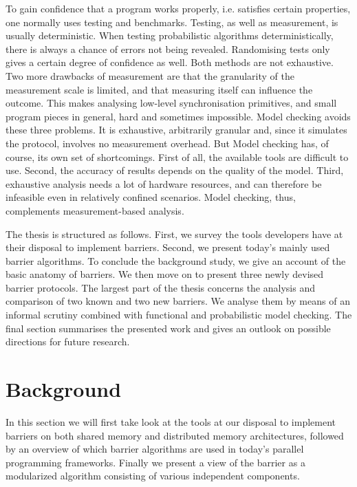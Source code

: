 \documentclass[a4paper, 10pt]{article}
\newcommand*\cleartooddpage{
	\clearpage
	\ifthenelse{\isodd{\thepage}}
		{}
		{\newpage \mbox{} \clearpage}
}
\begin{document}
To gain confidence that a program works properly, i.e. satisfies certain properties, one normally uses testing and benchmarks.
Testing, as well as measurement, is usually deterministic. When testing probabilistic algorithms deterministically, there is always a chance of errors not being revealed. Randomising tests only gives a certain degree of confidence as well. Both methods are not exhaustive.
Two more drawbacks of measurement are that the granularity of the measurement scale is limited, and that measuring itself can influence the outcome. This makes analysing low-level synchronisation primitives, and small program pieces in general, hard and sometimes impossible.
Model checking avoids these three problems. It is exhaustive, arbitrarily granular and, since it simulates the protocol, involves no measurement overhead. But Model checking has, of course, its own set of shortcomings. First of all, the available tools are difficult to use. Second, the accuracy of results depends on the quality of the model. Third, exhaustive analysis needs a lot of hardware resources, and can therefore be infeasible even in relatively confined scenarios.
Model checking, thus, complements measurement-based analysis.

The thesis is structured as follows. First, we survey the tools developers have at their disposal to implement barriers. Second, we present today's mainly used barrier algorithms. To conclude the background study, we give an account of the basic anatomy of barriers.
We then move on to present three newly devised barrier protocols.
The largest part of the thesis concerns the analysis and comparison of two known and two new barriers. We analyse them by means of an informal scrutiny combined with functional and probabilistic model checking.
The final section summarises the presented work and gives an outlook on possible directions for future research.

\cleartooddpage
\section{Background}
\label{sec:background}
In this section we will first take look at the tools at our disposal to implement barriers on both shared memory and distributed memory architectures, followed by an overview of which barrier algorithms are used in today's parallel programming frameworks.
Finally we present a view of the barrier as a modularized algorithm consisting of various independent components.
\end{document}
